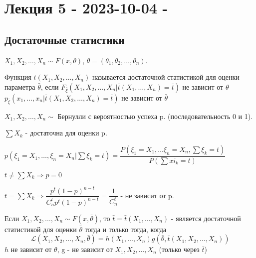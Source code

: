 \chapter{Лекция 5 - 2023-10-04 - }

\section{Достаточные статистики}


$X_1, X_2, \dots, X_n \sim F(x, \theta)$, $\theta = (\theta_1, \theta_2, \dots, \theta_n)$.

\begin{definition}
  Функция $t(X_1, X_2, \dots, X_n)$ называется достаточной статистикой для оценки параметра $\bar{\theta}$, если $F_{\bar \xi} (X_1, X_2, \dots, X_n | \bar{t} (X_1, \dots, X_n) = \bar t)$ не зависит от $\theta$ 
  $p_{\bar{\xi}} (x_1, \dots, x_n | \bar{t}(X_1, X_2, \dots, X_n) = \bar{t})$ не зависит от $\bar{\theta}$
\end{definition}

\begin{ex}
  $X_1, X_2, \dots, X_n \sim $ Бернулли с вероятностью успеха p. (последовательность 0 и 1).

  $\sum X_k$ - достаточна для оценки p.

  $p(\xi_1 = X_1, \dots, \xi_n = X_n | \sum \xi_k = t) = \dfrac{P(\xi_1 = X_1, \dots \xi_n = X_n, \sum \xi_k = t)}{P(\sum xi_k = t)}$

  $t \neq \sum X_k \Rightarrow p = 0 $

  $t = \sum X_k \Rightarrow \dfrac{ p^t (1-p)^{n-t} }{ C_n^t p^t (1-p)^{n-t} } = \dfrac{1}{C_n^t}$ - не зависит от p. 
\end{ex}

\begin{theorem}
  Если $X_1, X_2, \dots, X_n \sim F(x, \bar\theta)$, то $\bar t = \bar t (X_1, \dots, X_n)$ - является достаточной статистикой для оценки $\bar\theta$ тогда и только тогда, когда 
  \[
    \mathcal{L}(X_1, X_2, \dots, X_n, \bar\theta) = h(X_1, \dots, X_n) g(\bar\theta, \bar t (X_1, X_2, \dots, X_n))
  \]
  $h$ не зависит от $\theta$, g - не зависит от $X_1, X_2, \dots, X_n$ (только через $\bar t$)
\end{theorem}

